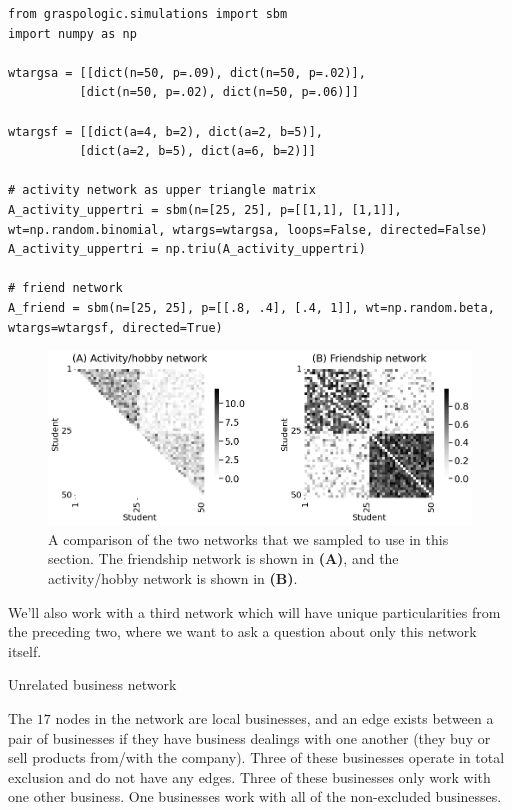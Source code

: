 \begin{lstlisting}[style=python]
from graspologic.simulations import sbm
import numpy as np

wtargsa = [[dict(n=50, p=.09), dict(n=50, p=.02)],
          [dict(n=50, p=.02), dict(n=50, p=.06)]]

wtargsf = [[dict(a=4, b=2), dict(a=2, b=5)],
          [dict(a=2, b=5), dict(a=6, b=2)]]

# activity network as upper triangle matrix
A_activity_uppertri = sbm(n=[25, 25], p=[[1,1], [1,1]], wt=np.random.binomial, wtargs=wtargsa, loops=False, directed=False)
A_activity_uppertri = np.triu(A_activity_uppertri)

# friend network
A_friend = sbm(n=[25, 25], p=[[.8, .4], [.4, 1]], wt=np.random.beta, wtargs=wtargsf, directed=True)
\end{lstlisting}

\begin{figure}[h]
    \centering
    \includegraphics[width=\linewidth]{representations/ch4/Images/friendex.png}
    \caption[Friendship and activities networks]{A comparison of the two networks that we sampled to use in this section. The friendship network is shown in \textbf{(A)}, and the activity/hobby network is shown in \textbf{(B)}.}
    \label{fig:ch4:friendex}
\end{figure}


We'll also work with a third network which will have unique particularities from the preceding two, where we want to ask a question about only this network itself. 
\begin{floatingbox}[h]\caption{Unrelated business network}
The $17$ nodes in the network are local businesses, and an edge exists between a pair of businesses if they have business dealings with one another (they buy or sell products from/with the company). Three of these businesses operate in total exclusion and do not have any edges. Three of these businesses only work with one other business. One businesses work with all of the non-excluded businesses. 
\end{floatingbox}

